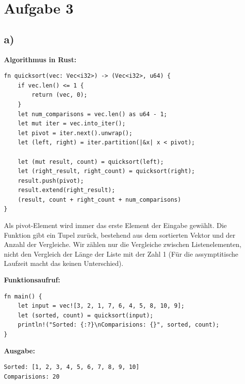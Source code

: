 \documentclass[a4paper]{scrartcl}
\begin{document}
\newpage
\section*{Aufgabe 3}
\subsection*{a)}

\textbf{Algorithmus in Rust:} 
\begin{lstlisting}
fn quicksort(vec: Vec<i32>) -> (Vec<i32>, u64) {
	if vec.len() <= 1 {
		return (vec, 0);
	}
	let num_comparisons = vec.len() as u64 - 1;
	let mut iter = vec.into_iter();
	let pivot = iter.next().unwrap();
	let (left, right) = iter.partition(|&x| x < pivot);

	let (mut result, count) = quicksort(left);
	let (right_result, right_count) = quicksort(right);
	result.push(pivot);
	result.extend(right_result);
	(result, count + right_count + num_comparisons)
}
\end{lstlisting}
Als pivot-Element wird immer das erste Element der Eingabe gewählt. Die Funktion gibt ein Tupel zurück, bestehend aus dem sortierten Vektor und der Anzahl der Vergleiche. 
Wir zählen nur die Vergleiche zwischen Listenelementen, nicht den Vergleich der Länge der Liste mit der Zahl 1 (Für die assymptitische Laufzeit macht das keinen Unterschied).

\textbf{Funktionsaufruf:}
\begin{lstlisting}
fn main() {
	let input = vec![3, 2, 1, 7, 6, 4, 5, 8, 10, 9];
	let (sorted, count) = quicksort(input);
	println!("Sorted: {:?}\nComparisions: {}", sorted, count);
}
\end{lstlisting}

\textbf{Ausgabe:}
\begin{lstlisting}
Sorted: [1, 2, 3, 4, 5, 6, 7, 8, 9, 10]
Comparisions: 20
\end{lstlisting}
\end{document}

